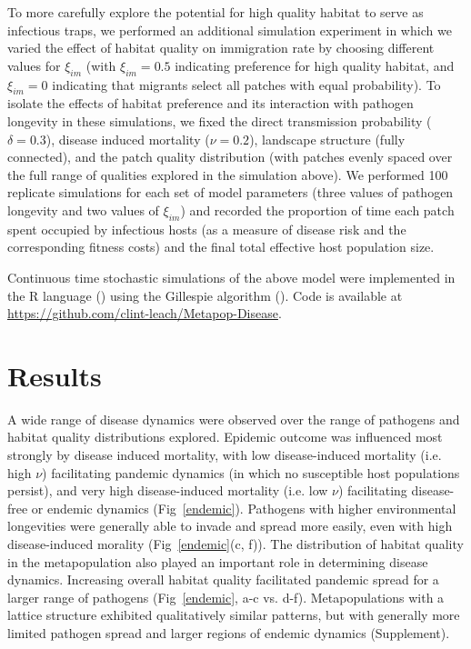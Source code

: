 \documentclass{article}
\begin{document}
To more carefully explore the potential for high quality habitat to serve as infectious traps, we performed an additional simulation experiment in which we varied the effect of habitat quality on immigration rate by choosing different values for $\xi_{im}$ (with $\xi_{im} = 0.5$ indicating preference for high quality habitat, and  $\xi_{im} = 0$ indicating that migrants select all patches with equal probability).  To isolate the effects of habitat preference and its interaction with pathogen longevity in these simulations, we fixed the direct transmission probability ($\delta = 0.3$), disease induced mortality ($\nu = 0.2$), landscape structure (fully connected), and the patch quality distribution (with patches evenly spaced over the full range of qualities explored in the simulation above).  We performed 100 replicate simulations for each set of model parameters (three values of pathogen longevity and two values of $\xi_{im}$) and recorded the proportion of time each patch spent occupied by infectious hosts (as a measure of disease risk and the corresponding fitness costs) and the final total effective host population size.

Continuous time stochastic simulations of the above model were implemented in the R language (\cite{R2014}) using the Gillespie algorithm (\cite{Gillespie1977}).  Code is available at \url{https://github.com/clint-leach/Metapop-Disease}.

\section{Results}
\label{results}

A wide range of disease dynamics were observed over the range of pathogens and habitat quality distributions explored.  
Epidemic outcome was influenced most strongly by disease induced mortality, with low disease-induced mortality (i.e. high $\nu$) facilitating pandemic dynamics (in which no susceptible host populations persist), and very high disease-induced mortality (i.e. low $\nu$) facilitating disease-free or endemic dynamics (Fig~\ref{endemic}). 
Pathogens with higher environmental longevities were generally able to invade and spread more easily, even with high disease-induced morality (Fig~\ref{endemic}(c, f)).  
The distribution of habitat quality in the metapopulation also played an important role in determining disease dynamics.  Increasing overall habitat quality facilitated pandemic spread for a larger range of pathogens (Fig~\ref{endemic}, a-c vs. d-f).
Metapopulations with a lattice structure exhibited qualitatively similar patterns, but with generally more limited pathogen spread and larger regions of endemic dynamics (Supplement).
\end{document}

